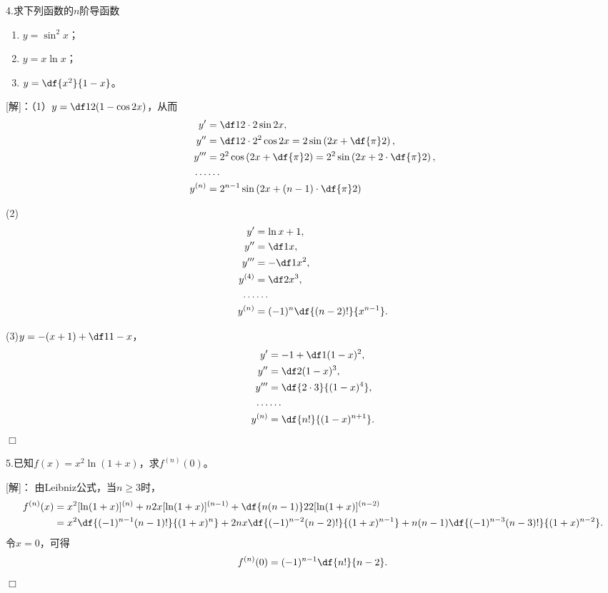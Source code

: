 \bigskip

4.求下列函数的$n$阶导函数
  \begin{enumerate}[(1)]
    \setlength{\itemindent}{1cm}
    \item $y=\sin^2x$；
    \item $y=x\ln x$；
    \item $y=\df{x^2}{1-x}$。
  \end{enumerate}
  
[解]：（1）$y=\df12(1-\cos2x)$，从而
\begin{align*}
	y'&=\df12\cdot 2\sin2x,\\
	y''&=\df12\cdot 2^2\cos2x=2\sin\left(2x+\df{\pi}2\right),\\
	y'''&=2^2\cos\left(2x+\df{\pi}2\right)=2^2\sin\left(2x+2\cdot\df{\pi}2\right),\\
	\ldots&\ldots\\
	y^{(n)}&=2^{n-1}\sin\left(2x+(n-1)\cdot\df{\pi}2\right)
\end{align*}

(2)
\begin{align*}
	y'&=\ln x+1,\\
	y''&=\df1x,\\
	y'''&=-\df1{x^2},\\
	y^{(4)}&=\df2{x^3},\\
	\ldots&\ldots\\
	y^{(n)}&=(-1)^n\df{(n-2)!}{x^{n-1}}.
\end{align*}

(3)$y=-(x+1)+\df1{1-x}$，
\begin{align*}
	y'&=-1+\df1{(1-x)^2},\\
	y''&=\df2{(1-x)^3},\\
	y'''&=\df{2\cdot 3}{(1-x)^4},\\
	\ldots&\ldots\\
	y^{(n)}&=\df{n!}{(1-x)^{n+1}}.
\end{align*}
\hfill$\Box$

\bigskip

5.已知$f(x)=x^2\ln(1+x)$，求$f^{(n)}(0)$。

[解]：
由Leibniz公式，当$n\geq3$时，
\begin{align*}
	f^{(n)}(x)&=x^2[\ln(1+x)]^{(n)}+n2x[\ln(1+x)]^{(n-1)}
	+\df{n(n-1)}22[\ln(1+x)]^{(n-2)}\\
	&=x^2\df{(-1)^{n-1}(n-1)!}{(1+x)^n}+2nx\df{(-1)^{n-2}(n-2)!}{(1+x)^{n-1}}
	+n(n-1)\df{(-1)^{n-3}(n-3)!}{(1+x)^{n-2}}.
\end{align*}
令$x=0$，可得
$$f^{(n)}(0)=(-1)^{n-1}\df{n!}{n-2}.$$
\hfill$\Box$

